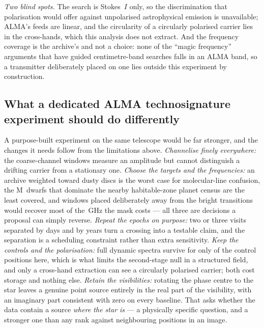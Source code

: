 \noindent\emph{Two blind spots.} The search is Stokes~$I$ only, so the
discrimination that polarisation would offer against unpolarised
astrophysical emission is unavailable; ALMA's feeds are linear, and the
circularity of a circularly polarised carrier lies in the cross-hands, which
this analysis does not extract. And the frequency coverage is the archive's
and not a choice: none of the ``magic frequency'' arguments that have guided
centimetre-band searches falls in an ALMA band, so a transmitter deliberately
placed on one lies outside this experiment by construction.

\subsection{What a dedicated ALMA technosignature experiment should do
differently}
\label{sec:future}

A purpose-built experiment on the same telescope would be far stronger, and
the changes it needs follow from the limitations above. \emph{Channelise
finely everywhere:} the \NCoarse{} coarse-channel windows measure an amplitude
but cannot distinguish a drifting carrier from a stationary one.
\emph{Choose the targets and the frequencies:} an archive weighted toward
dusty discs is the worst case for molecular-line confusion, the M~dwarfs that
dominate the nearby habitable-zone planet census are the least covered, and
windows placed deliberately away from the bright transitions would recover
most of the \MaskLostGHz\,GHz the mask costs --- all three are decisions a
proposal can simply reverse. \emph{Repeat the epochs on purpose:} two or
three visits separated by days and by years turn a crossing into a testable
claim, and the separation is a scheduling constraint rather than extra
sensitivity. \emph{Keep the controls and the polarisation:} full dynamic
spectra survive for only \LNNRetained{} of the \NCtrl{} control positions
here, which is what limits the second-stage null in a structured field, and
only a cross-hand extraction can see a circularly polarised carrier; both cost
storage and nothing else. \emph{Retain the visibilities:} rotating the phase
centre to the star leaves a genuine point source entirely in the real part of
the visibility, with an imaginary part consistent with zero on every
baseline. That asks whether the data contain a source \emph{where the star
is} --- a physically specific question, and a stronger one than any rank
against neighbouring positions in an image.

